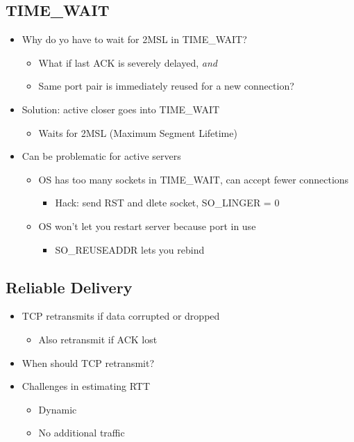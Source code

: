 \subsection{TIME\_WAIT}
\begin{itemize}[nosep]
    \item Why do yo have to wait for 2MSL in TIME\_WAIT?
          \begin{itemize}[nosep]
              \item What if last ACK is severely delayed, \emph{and}
              \item Same port pair is immediately reused for a new connection?
          \end{itemize}
    \item Solution: active closer goes into TIME\_WAIT
          \begin{itemize}[nosep]
              \item Waits for 2MSL (Maximum Segment Lifetime)
          \end{itemize}
    \item Can be problematic for active servers
          \begin{itemize}[nosep]
              \item OS has too many sockets in TIME\_WAIT, can accept fewer connections
                    \begin{itemize}[nosep]
                        \item Hack: send RST and dlete socket, SO\_LINGER = 0
                    \end{itemize}
              \item OS won't let you restart server because port in use
                    \begin{itemize}[nosep]
                        \item SO\_REUSEADDR lets you rebind
                    \end{itemize}
          \end{itemize}
\end{itemize}

\subsection{Reliable Delivery}
\begin{itemize}[nosep]
    \item TCP retransmits if data corrupted or dropped
          \begin{itemize}[nosep]
              \item Also retransmit if ACK lost
          \end{itemize}
    \item When should TCP retransmit?
    \item Challenges in estimating RTT
          \begin{itemize}[nosep]
              \item Dynamic
              \item No additional traffic
          \end{itemize}
\end{itemize}

